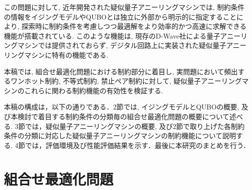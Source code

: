 \documentclass[submit,techrep,noauthor]{ipsj}
\begin{document}
この問題に対して, 近年開発された疑似量子アニーリングマシンでは, 制約条件の情報をイジングモデルやQUBOとは独立に外部から明示的に指定することにより, 探索時に制約条件を考慮しつつ最適解をより効率的かつ高速に求解できる機能が搭載されている. このような機能は, 現存のD-Wave社による量子アニーリングマシンでは提供されておらず, デジタル回路上に実装された疑似量子アニーリングマシンに特有の機能である. 

本稿では, 組合せ最適化問題における制約部分に着目し, 実問題において頻出するワンホット制約, 不等式制約, 禁止ペア制約に対して, 疑似量子アニーリングマシンのこれらに関わる制約機能の有効性を検証する.

本稿の構成は，以下の通りである．2節では, イジングモデルとQUBOの概要, 及び本検討で着目する制約条件の分類毎の組合せ最適化問題の概要について述べる. 3節では，疑似量子アニーリングマシンの概要, 及び2節で取り上げた各制約条件の分類に対応した疑似量子アニーリングマシンの制約機能について説明する. 4節では，評価環境及び性能評価結果を示す．最後に本研究のまとめを行う．

\section{組合せ最適化問題}

\end{document}
